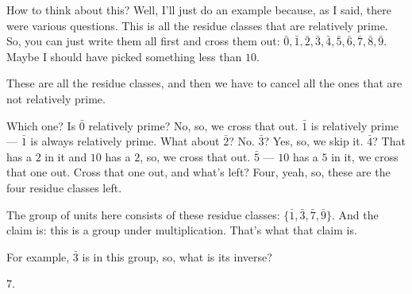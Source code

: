 \begin{speech}[00:07:18 - 00:08:43]
How to think about this? Well, I'll just do an example because, as I said, there were various questions. This is all the residue classes that are relatively prime. So, you can just write them all first and cross them out: $\bar{0}, \bar{1}, \bar{2}, \bar{3}, \bar{4}, \bar{5}, \bar{6}, \bar{7}, \bar{8}, \bar{9}$.  Maybe I should have picked something less than $10$.

These are all the residue classes, and then we have to cancel all the ones that are not relatively prime.

Which one? Is $\bar{0}$ relatively prime? No, so, we cross that out.  $\bar{1}$ is relatively prime --- $\bar{1}$ is always relatively prime. What about $\bar{2}$? No.  $\bar{3}$? Yes, so, we skip it. $\bar{4}$? That has a $2$ in it and $10$ has a $2$, so, we cross that out.  $\bar{5}$ --- $10$ has a $5$ in it, we cross that one out.  Cross that one out,  and what's left? Four, yeah, so, these are the four residue classes left. 

The group of units here consists of these residue classes:  $\{\bar{1}, \bar{3}, \bar{7}, \bar{9}\}$. And the claim is: this is a group under multiplication. That's what that claim is.

For example, $\bar{3}$ is in this group, so, what is its inverse? 
\end{speech}

\begin{student}
$7$.
\end{student}

